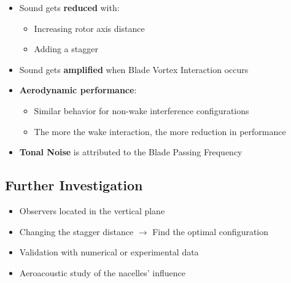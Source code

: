 \begin{frame}{\subsecname}
\begin{minipage}[t]{0.43\linewidth}
\end{minipage}





\end{frame}


\begin{frame}
   \begin{itemize}
       \item Sound gets \textbf{reduced} with:
       \begin{itemize}
        \item Increasing rotor axis distance
        \item Adding a stagger
       \end{itemize}

       \item Sound gets \textbf{amplified} when Blade Vortex Interaction occurs

       \item \textbf{Aerodynamic performance}:
       \begin{itemize}
           \item Similar behavior for non-wake interference configurations
           \item The more the wake interaction, the more reduction in performance
       \end{itemize}

       \item \textbf{Tonal Noise} is attributed to the Blade Passing Frequency

       
   \end{itemize}
\end{frame}

 \subsection{Further Investigation}
 \begin{frame} {\subsecname}
     \begin{itemize}
         \item Observers located in the vertical plane
         \item Changing the stagger distance $\xrightarrow{}$ Find the optimal configuration
         \item Validation with numerical or experimental data
         \item Aeroacoustic study of the nacelles' influence
     \end{itemize}
 \end{frame}

